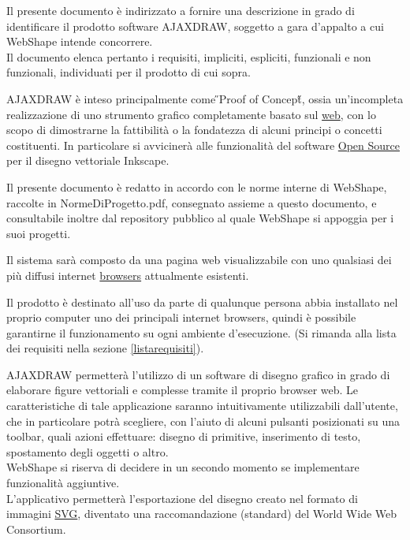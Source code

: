 \newpage
\thispagestyle{fancy}
\tableofcontents
\thispagestyle{fancy}
\newpage
\parskip=-5pt


Il presente documento \`e indirizzato a fornire una descrizione in grado di identificare il prodotto software AJAXDRAW, soggetto a gara d'appalto a cui WebShape intende concorrere.\\
Il documento elenca pertanto i requisiti, impliciti, espliciti, funzionali e non funzionali, individuati per il prodotto di cui sopra.

AJAXDRAW \`e inteso principalmente come \H{}Proof of Concept\H{}, ossia un'incompleta realizzazione di uno strumento grafico completamente basato sul {\underline{web}}, con lo scopo di dimostrarne la fattibilit\`a o la fondatezza di alcuni principi o concetti costituenti. In particolare si avviciner\` a alle funzionalit\`a  del software \underline{Open Source} per il disegno vettoriale Inkscape.

Il presente documento \`e redatto in accordo con le norme interne di WebShape, raccolte in NormeDiProgetto.pdf, consegnato assieme a questo documento, e consultabile inoltre dal repository pubblico al quale WebShape si appoggia per i suoi progetti.



Il sistema sar\`a composto da una pagina web visualizzabile con uno qualsiasi dei pi\`u diffusi internet {\underline{browsers}} attualmente esistenti.

Il prodotto \`e destinato all'uso da parte di qualunque persona abbia installato nel proprio computer uno dei principali internet browsers, quindi \`e possibile garantirne il funzionamento su ogni ambiente d'esecuzione. (Si rimanda alla lista dei requisiti nella sezione \ref{listarequisiti}).

AJAXDRAW permetter\`a l'utilizzo di un software di disegno grafico in grado di elaborare figure vettoriali e complesse tramite il proprio browser web. Le caratteristiche di tale applicazione saranno intuitivamente utilizzabili dall'utente, che in particolare potr\`a scegliere, con l'aiuto di alcuni pulsanti posizionati su una toolbar, quali azioni effettuare: disegno di primitive, inserimento di testo, spostamento degli oggetti o altro.\\
WebShape si riserva di decidere in un secondo momento se implementare funzionalit\`a aggiuntive.\\%
L'applicativo permetter\`a l'esportazione del disegno creato nel formato di immagini \underline{SVG}, diventato una raccomandazione (standard) del World Wide Web Consortium.

